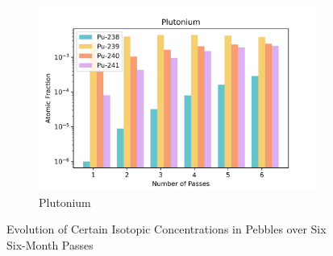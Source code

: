 \begin{figure}[h!]
%
\begin{subfigure}{0.25\textwidth}
  \includegraphics[width=0.95\linewidth]{figures/compositions/plutonium}
  \caption{Plutonium}
  \label{fig:pu}
\end{subfigure}%

\caption{Evolution of Certain Isotopic Concentrations in Pebbles over Six Six-Month Passes}
\label{fig:comps}
\end{figure}